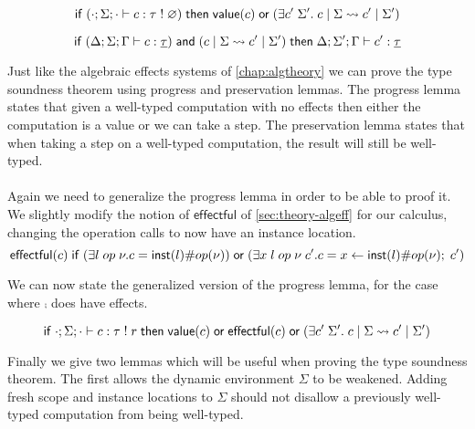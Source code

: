 {\begin{lemma}[Progress]
\[
	\mathsf{if}\;
		(\cdot;\Sigma;\cdot \vdash c : \tau \; ! \; \varnothing)
	\;\mathsf{then}\;
		\mathsf{value}(c)
		\;\mathsf{or}\;
		(\exists c' \; \Sigma'.\; c \;|\; \Sigma \rightsquigarrow c' \;|\; \Sigma')
\]
\end{lemma}

\begin{lemma}[Preservation]
\[
	\mathsf{if}\;
		(\Delta;\Sigma;\Gamma \vdash c : \underline{\tau})
		\;\mathsf{and}\;
		(c \;|\; \Sigma \rightsquigarrow c' \;|\; \Sigma')
	\;\mathsf{then}\;
		\Delta;\Sigma';\Gamma \vdash c' : \underline{\tau}
\]
\end{lemma}

Just like the algebraic effects systems of \cref{chap:algtheory} we can prove the type soundness theorem using progress and preservation lemmas.
The progress lemma states that given a well-typed computation with no effects then either the computation is a value or we can take a step.
The preservation lemma states that when taking a step on a well-typed computation, the result will still be well-typed.
\\\\
Again we need to generalize the progress lemma in order to be able to proof it.
We slightly modify the notion of $\mathsf{effectful}$ of \cref{sec:theory-algeff} for our calculus, changing the operation calls to now have an instance location.
	\[ \mathsf{effectful}(c) \;\mathsf{if}\; (\exists l \; op \; \nu. c = \mathsf{inst}(l) \# op(\nu)) \;\mathsf{or}\; (\exists x \; l \; op \; \nu \; c'. c = x \leftarrow \mathsf{inst}(l) \# op(\nu) ;\; c') \]

We can now state the generalized version of the progress lemma, for the case where $\comp$ does have effects.

\begin{lemma}
\[
	\mathsf{if}\;
		\cdot;\Sigma;\cdot \vdash c : \tau \; ! \; r
	\;\mathsf{then}\;
		\mathsf{value}(c)
		\;\mathsf{or}\;
		\mathsf{effectful}(c)
		\;\mathsf{or}\;
		(\exists c' \; \Sigma'.\; c \;|\; \Sigma \rightsquigarrow c' \;|\; \Sigma')
\]
\end{lemma}

Finally we give two lemmas which will be useful when proving the type soundness theorem.
The first allows the dynamic environment $\Sigma$ to be weakened.
Adding fresh scope and instance locations to $\Sigma$ should not disallow a previously well-typed computation from being well-typed.

}
